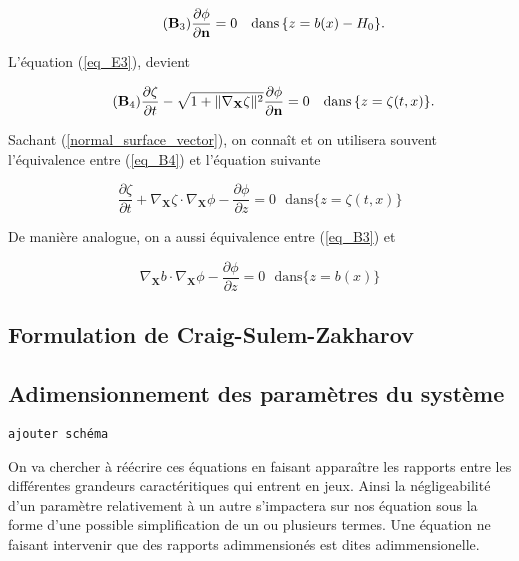 \documentclass[12pt,a4paper]{article}
\numberwithin{equation}{section}
\begin{document}
\begin{equation} \tag{$\textbf{B}_3$} \label{eq_B3}
    \frac{\partial \phi}{\partial \textbf{n}} = 0 ~~~ \text{dans}\,\{z = b(x)-H_0\} .
\end{equation}

L'équation (\ref{eq_E3}), devient

\begin{equation} \tag{$\textbf{B}_4$} \label{eq_B4}
\frac{\partial \zeta}{\partial t}  - \sqrt{1+ \| \nabla_\textbf{X}\zeta\|^2}\frac{\partial \phi}{\partial\textbf{n}} = 0~~~\text{dans}\,\{z = \zeta(t,x)\} .
\end{equation}

Sachant (\ref{normal_surface_vector}), on connaît et on utilisera souvent l'équivalence entre (\ref{eq_B4}) et l'équation suivante


\begin{equation} \label{eq_B4_bis}
    \frac{\partial \zeta}{\partial t}  + \nabla_\textbf{X}\zeta\cdot\nabla_\textbf{X}\phi - \frac{\partial\phi}{\partial z} = 0 ~~~\text{dans}\{z = \zeta(t,x)\} 
\end{equation}

De manière analogue, on a aussi équivalence entre (\ref{eq_B3}) et 

\begin{equation} \label{eq_B3_bis}
    \nabla_\textbf{X}b\cdot\nabla_\textbf{X}\phi - \frac{\partial\phi}{\partial z} = 0 ~~~\text{dans}\{z = b(x)\} 
\end{equation}



\subsection{Formulation de Craig-Sulem-Zakharov}
\subsection{Adimensionnement des paramètres du système}

\begin{center}
    \texttt{ajouter schéma}
\end{center}

On va chercher à réécrire ces équations en faisant apparaître les rapports entre les différentes grandeurs caractéritiques qui entrent en jeux. Ainsi la négligeabilité d'un paramètre relativement à un autre s'impactera sur nos équation sous la forme d'une possible simplification de un ou plusieurs termes. Une équation ne faisant intervenir que des rapports adimmensionés est dites adimmensionelle. 
\\
\end{document}
